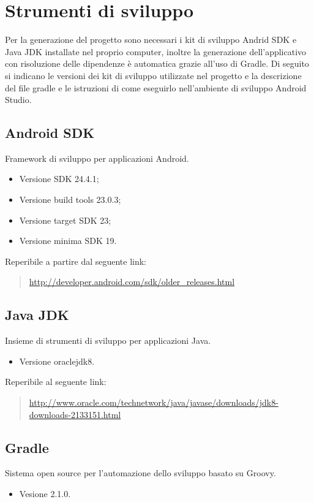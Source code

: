 \documentclass[../ManualeSviluppatore.tex]{subfiles}
\begin{document}
\section{Strumenti di sviluppo}
	
	Per la generazione del progetto sono necessari i kit di sviluppo Andrid SDK e Java JDK installate nel proprio computer, inoltre la generazione dell'applicativo con risoluzione delle dipendenze è automatica grazie all'uso di Gradle.
	Di seguito si indicano le versioni dei kit di sviluppo utilizzate nel progetto e la descrizione del file gradle e le istruzioni di come eseguirlo nell'ambiente di sviluppo Android Studio.

	\subsection{Android SDK}
		Framework di sviluppo per applicazioni Android.
		\begin{itemize} 
			\item Versione SDK 24.4.1;
			\item Versione build tools 23.0.3;
			\item Versione target SDK 23;
			\item Versione minima SDK 19.
		\end{itemize}
		Reperibile a partire dal seguente link:
		\begin{quote}
			\centering
			\url{http://developer.android.com/sdk/older_releases.html}
		\end{quote}
		
	\subsection{Java JDK}
		Insieme di strumenti di sviluppo per applicazioni Java. 
		\begin{itemize} 
			\item Versione oraclejdk8.
		\end{itemize}
		Reperibile al seguente link:
		\begin{quote}
			\centering
			\url{http://www.oracle.com/technetwork/java/javase/downloads/jdk8-downloads-2133151.html}
		\end{quote}
		
	\newpage
	\subsection{Gradle}
	\label{subsec:Gradle}
		Sistema open source per l'automazione dello sviluppo basato su Groovy.
		\begin{itemize} 
			\item Vesione 2.1.0.
		\end{itemize}
		
\end{document}

